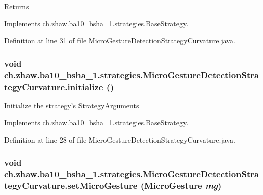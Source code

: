 \begin{DoxyReturn}{Returns}

\end{DoxyReturn}


Implements \hyperlink{classch_1_1zhaw_1_1ba10__bsha__1_1_1strategies_1_1BaseStrategy_aa0ebed55eed45409bad13d43a0058780}{ch.zhaw.ba10\_\-bsha\_\-1.strategies.BaseStrategy}.

Definition at line 31 of file MicroGestureDetectionStrategyCurvature.java.\hypertarget{classch_1_1zhaw_1_1ba10__bsha__1_1_1strategies_1_1MicroGestureDetectionStrategyCurvature_a294fbd255e0bcd3e5dd452f1ad8e3f85}{
\subsubsection[{initialize}]{\setlength{\rightskip}{0pt plus 5cm}void ch.zhaw.ba10\_\-bsha\_\-1.strategies.MicroGestureDetectionStrategyCurvature.initialize ()}}
\label{classch_1_1zhaw_1_1ba10__bsha__1_1_1strategies_1_1MicroGestureDetectionStrategyCurvature_a294fbd255e0bcd3e5dd452f1ad8e3f85}
Initialize the strategy's \hyperlink{classch_1_1zhaw_1_1ba10__bsha__1_1_1StrategyArgument}{StrategyArgument}s 

Implements \hyperlink{classch_1_1zhaw_1_1ba10__bsha__1_1_1strategies_1_1BaseStrategy_af6ea27835befac71906915236a347450}{ch.zhaw.ba10\_\-bsha\_\-1.strategies.BaseStrategy}.

Definition at line 28 of file MicroGestureDetectionStrategyCurvature.java.\hypertarget{classch_1_1zhaw_1_1ba10__bsha__1_1_1strategies_1_1MicroGestureDetectionStrategyCurvature_a8e53337041e648e2e5f9c72cc74d7a0e}{
\subsubsection[{setMicroGesture}]{\setlength{\rightskip}{0pt plus 5cm}void ch.zhaw.ba10\_\-bsha\_\-1.strategies.MicroGestureDetectionStrategyCurvature.setMicroGesture ({\bf MicroGesture} {\em mg})}}
\label{classch_1_1zhaw_1_1ba10__bsha__1_1_1strategies_1_1MicroGestureDetectionStrategyCurvature_a8e53337041e648e2e5f9c72cc74d7a0e}



